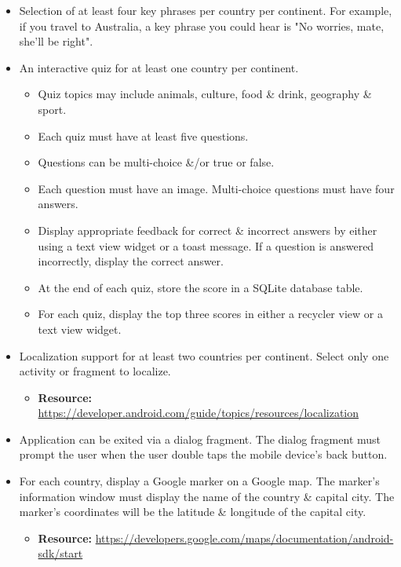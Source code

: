 \documentclass{article}
\begin{document}
\begin{itemize}
	\item Selection of at least four key phrases per country per continent. For example, if you travel to Australia, a key phrase you could hear is "No worries, mate, she'll be right".
	\item An interactive quiz for at least one country per continent.
	      \begin{itemize}
	      	\item Quiz topics may include animals, culture, food \& drink, geography \& sport.
	      	\item Each quiz must have at least five questions.
	      	\item Questions can be multi-choice \&/or true or false.
	      	\item Each question must have an image. Multi-choice questions must have four answers.
	      	\item Display appropriate feedback for correct \& incorrect answers by either using a text view widget or a toast message. If a question is answered incorrectly, display the correct answer.
	      	\item At the end of each quiz, store the score in a SQLite database table. 
	      	\item For each quiz, display the top three scores in either a recycler view or a text view widget.
	      \end{itemize}
	\item Localization support for at least two countries per continent. Select only one activity or fragment to localize.
	      \begin{itemize}
	      	\item \textbf{Resource:} \footnotesize\href{https://developer.android.com/guide/topics/resources/localization/}{https://developer.android.com/guide/topics/resources/localization}
	      \end{itemize}
	\item Application can be exited via a dialog fragment. The dialog fragment must prompt the user when the user double taps the mobile device's back button.
	\item For each country, display a Google marker on a Google map. The marker's information window must display the name of the country \& capital city. The marker's coordinates will be the latitude \& longitude of the capital city.
	      \begin{itemize}
	      	\item \textbf{Resource:} \footnotesize\href{https://developers.google.com/maps/documentation/android-sdk/start}{https://developers.google.com/maps/documentation/android-sdk/start}

\end{itemize}
\end{itemize}
\end{document}
